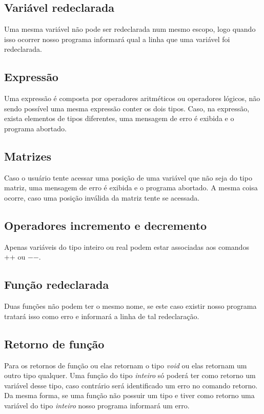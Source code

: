 \documentclass[
12pt,				%
a4paper,			%
english,			%
french,				%
spanish,			%
brazil,				%
article
]{abntex2}
\begin{document}
\subsection{Variável redeclarada}
Uma mesma variável não pode ser redeclarada num mesmo escopo, logo quando isso ocorrer nosso programa informará qual a linha que uma variável foi redeclarada.

\subsection{Expressão}
Uma expressão é composta por operadores aritméticos ou operadores lógicos, não sendo possível uma mesma expressão conter os dois tipos. Caso, na expressão, exista elementos de tipos diferentes, uma mensagem de erro é exibida e o programa abortado.

\subsection{Matrizes}
Caso o usuário tente acessar uma posição de uma variável que não seja do tipo matriz, uma mensagem de erro é exibida e o programa abortado. A mesma coisa ocorre, caso uma posição inválida da matriz tente se acessada.

\subsection{Operadores incremento e decremento}
Apenas variáveis do tipo inteiro ou real podem estar associadas aos comandos ++ ou \textit{$-$$-$}.

\subsection{Função redeclarada}
Duas funções não podem ter o mesmo nome, se este caso existir nosso programa tratará isso como erro e informará a linha de tal redeclaração.

\subsection{Retorno de função}
Para os retornos de função ou elas retornam o tipo \textit{void} ou elas retornam um outro tipo qualquer. Uma função do tipo \textit{inteiro} só poderá ter como retorno um variável desse tipo, caso contrário será identificado um erro no comando retorno. Da mesma forma, se uma função não possuir um tipo e tiver como retorno uma variável do tipo \textit{inteiro} nosso programa informará um erro.
\end{document}
